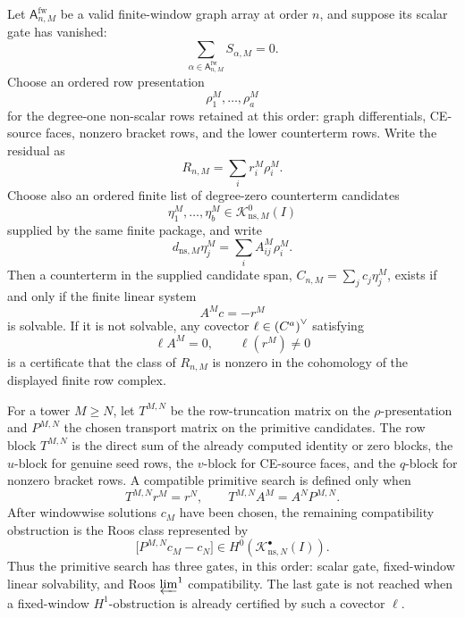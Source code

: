 \begin{prop}\label{prop:finite-row-primitive-search-interface}
  Let \(\mathsf A^{\mathrm{fw}}_{n,M}\) be a valid finite-window graph
  array at order \(n\), and suppose its scalar gate has vanished:
  \[
    \sum_{\alpha\in\mathsf A^{\mathrm{fw}}_{n,M}}S_{\alpha,M}=0.
  \]
  Choose an ordered row presentation
  \[
    \rho^M_1,\ldots,\rho^M_a
  \]
  for the degree-one non-scalar rows retained at this order: graph
  differentials, CE-source faces, nonzero bracket rows, and the lower
  counterterm rows.  Write the residual as
  \[
    R_{n,M}=\sum_i r^M_i\rho^M_i.
  \]
  Choose also an ordered finite list of degree-zero counterterm candidates
  \[
    \eta^M_1,\ldots,\eta^M_b\in
    \mathcal K^0_{\mathrm{ns},M}(I)
  \]
  supplied by the same finite package, and write
  \[
    d_{\mathrm{ns},M}\eta^M_j=\sum_i A^M_{ij}\rho^M_i.
  \]
  Then a counterterm in the supplied candidate span,
  \(C_{n,M}=\sum_j c_j\eta^M_j\), exists if and only if the finite linear
  system
  \[
    A^M c=-r^M
  \]
  is solvable.  If it is not solvable, any covector
  \(\ell\in{\left(C^a\right)}^\vee\) satisfying
  \[
    \ell A^M=0,\qquad \ell(r^M)\neq0
  \]
  is a certificate that the class of \(R_{n,M}\) is nonzero in the
  cohomology of the displayed finite row complex.

  For a tower \(M\geq N\), let \(T^{M,N}\) be the row-truncation matrix on
  the \(\rho\)-presentation and \(P^{M,N}\) the chosen transport matrix on
  the primitive candidates.  The row block \(T^{M,N}\) is the direct sum of
  the already computed identity or zero blocks, the \(u\)-block for genuine
  seed rows, the \(v\)-block for CE-source faces, and the \(q\)-block for
  nonzero bracket rows.  A compatible primitive search is defined only when
  \[
    T^{M,N}r^M=r^N,\qquad
    T^{M,N}A^M=A^N P^{M,N}.
  \]
  After windowwise solutions \(c_M\) have been chosen, the remaining
  compatibility obstruction is the Roos class represented by
  \[
    \bigl[P^{M,N}c_M-c_N\bigr]\in
    H^0(\mathcal K^\bullet_{\mathrm{ns},N}(I)).
  \]
  Thus the primitive search has three gates, in this order: scalar gate,
  fixed-window linear solvability, and Roos \(\varprojlim^1\)
  compatibility.  The last gate is not reached when a fixed-window
  \(H^1\)-obstruction is already certified by such a covector \(\ell\).
\end{prop}


